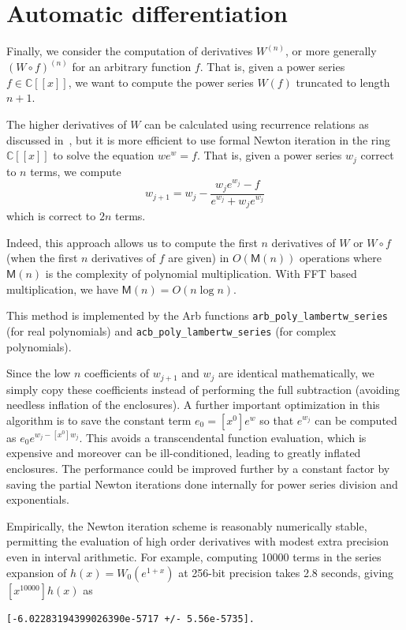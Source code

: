 \documentclass[11pt,a4paper]{article}
\begin{document}
\section{Automatic differentiation}

Finally, we consider the computation of derivatives $W^{(n)}$,
or more generally $(W \circ f)^{(n)}$ for an arbitrary function $f$.
That is, given a power series $f \in \mathbb{C}[[x]]$, we want
to compute the power series $W(f)$ truncated to length $n + 1$.

The higher derivatives of $W$ can be
calculated using recurrence relations as discussed in~\cite{corless1996lambertw},
but it is more efficient to use formal Newton iteration
in the ring $\mathbb{C}[[x]]$ to solve the equation $w e^{w} = f$.
That is, given a power series $w_j$ correct to $n$ terms, we compute
$$w_{j+1}=w_j-\frac{w_j e^{w_j}-f}{e^{w_j}+w_j e^{w_j}}$$
which is correct to $2n$ terms.

Indeed, this approach allows us to compute the first $n$ derivatives
of $W$ or $W \circ f$ (when the first $n$ derivatives of $f$ are given)
in $O(\mathsf{M}(n))$ operations
where $\mathsf{M}(n)$ is the complexity of polynomial multiplication.
With FFT based multiplication, we have $\mathsf{M}(n) = O(n \log n)$.

This method is implemented by the Arb functions
\texttt{arb\_poly\_lambertw\_series} (for real polynomials)
and \texttt{acb\_poly\_lambertw\_series} (for complex polynomials).

Since the low $n$ coefficients of $w_{j+1}$ and $w_j$ are identical
mathematically, we simply copy these coefficients instead of
performing the full subtraction (avoiding needless inflation of the enclosures).
A further important optimization in this algorithm is to
save the constant term $e_0 = [x^0] e^w$ so that $e^{w_j}$ can be computed
as $e_0 e^{w_j - [x^0] w_j}$. This avoids a transcendental
function evaluation, which is expensive
and moreover can be ill-conditioned, leading to greatly inflated
enclosures.
The performance could be improved further by a constant factor
by saving the partial Newton iterations done internally for power series
division and exponentials.

Empirically, the Newton iteration scheme is reasonably numerically stable,
permitting the evaluation of high order derivatives with
modest extra precision even in interval arithmetic.
For example, computing 10000 terms in the series
expansion of $h(x) = W_0(e^{1+x})$
at 256-bit precision takes 2.8 seconds, giving $[x^{10000}] h(x)$ as
\begin{small}
\begin{verbatim}
[-6.02283194399026390e-5717 +/- 5.56e-5735].
\end{verbatim}
\end{small}
\end{document}
